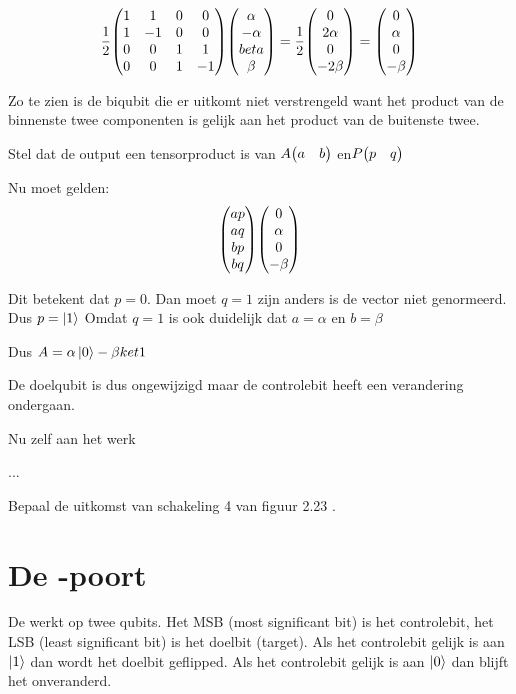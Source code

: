 \documentclass[../main.tex]{subfiles}
\begin{document}
\[
\frac{1}{2}
\mqty(1&1&0&0\\1&-1&0&0\\0&0&1&1\\0&0&1&-1)
\mqty(\alpha\\-\alpha\\ \-beta\\ \beta)=
\frac{1}{2}
\mqty(0\\2\alpha\\ 0\\ -2\beta)=
\mqty(0\\ \alpha\\ 0\\ -\beta)
\]

Zo te zien is de biqubit die er uitkomt niet verstrengeld want het product van de binnenste twee componenten is gelijk aan het product van de buitenste twee. 

Stel dat de output een tensorproduct is van $\matr{A}\mqty(a&b)$ en$\matr{P}\mqty(p&q)$

Nu moet gelden:
\[
\mqty(ap\\aq\\bp\\bq)
\mqty(0\\ \alpha\\ 0\\ -\beta)
\]

Dit betekent dat $p=0$. Dan moet $q=1$ zijn anders is de vector niet genormeerd. Dus $p = \ket{1}$
Omdat $q= 1$ is ook duidelijk dat $a=\alpha$ en $b=\beta$

Dus $A=\alpha\ket{0}-\beta{ket1}$

De doelqubit is dus ongewijzigd maar de controlebit heeft een verandering ondergaan.

Nu zelf aan het werk

\begin{antwoord}
...
\end{antwoord}
\begin{opdracht}
Bepaal de uitkomst van schakeling 4 van figuur 2.23 .
\end{opdracht}

\section{De -poort}
De  werkt op twee qubits. 
Het MSB (most significant bit) is het controlebit, het LSB (least significant bit) is het doelbit (target). Als het controlebit gelijk is aan $\ket{1}$ dan wordt het doelbit geflipped. Als het controlebit gelijk is aan $\ket{0}$ dan blijft het onveranderd.
\end{document}
